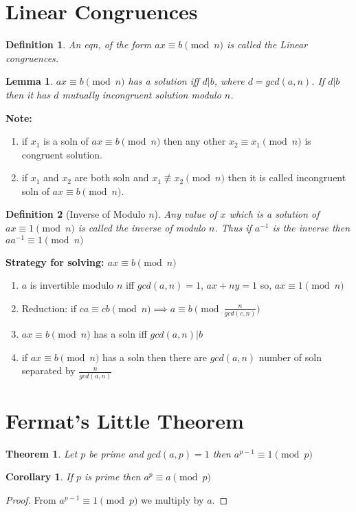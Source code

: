 \documentclass[12pt,a4paper]{article}
\newtheorem{thm}{Theorem}
\newtheorem{defn}{Definition}
\newtheorem{lem}{Lemma}
\newtheorem{cor}{Corollary}
\begin{document}
\section{Linear Congruences}
\begin{defn}
	An eqn, of the form $ax\equiv b \pmod n$ is called the Linear congruences.
\end{defn}
\begin{lem}
	$ax \equiv b \pmod n$ has a solution iff $d|b$, where $d=gcd(a,n)$. If $d|b$ then it has $d$ mutually incongruent solution modulo $n$.
\end{lem}
\textbf{Note: }
\begin{enumerate}
	\item if $x_{1}$ is a soln of $ax \equiv b \pmod n$ then any other $x_{2} \equiv x_{1}  \pmod n$ is congruent solution.
	\item if $x_{1}$ and $x_{2}$ are both soln and  $x_{1} \not \equiv x_{2}  \pmod n$ then it is called incongruent soln of $ax \equiv b \pmod n$.
\end{enumerate}

\begin{defn}[Inverse of Modulo $n$]
Any value of $x$ which is a solution of $ax \equiv 1 \pmod n$ is called the inverse of modulo $n$. Thus if $a^{-1}$ is the inverse then $aa^{-1} \equiv 1 \pmod n$
\end{defn}

\textbf{Strategy for solving: $ax \equiv b \pmod n$}
\begin{enumerate}
	\item $a$ is invertible modulo $n$ iff $gcd(a,n)=1$, $ax+ny=1$ so, $ax\equiv 1 \pmod n$
	\item Reduction: if $ca\equiv cb \pmod n \implies a \equiv b \pmod {\frac{n}{gcd(c,n)}}$
	\item $ax \equiv b \pmod n$ has a soln iff $gcd(a,n)|b$
	\item if $ax \equiv b \pmod n$ has a soln then there are $gcd(a,n)$ number of soln separated by $\frac{n}{gcd(a,n)}$
\end{enumerate}

\section{Fermat's Little Theorem}
\begin{thm}
	Let $p$ be prime and $gcd(a,p)=1$ then $a^{p-1} \equiv 1 \pmod p$
\end{thm}
\begin{cor}
	If $p$ is prime then $a^{p} \equiv a \pmod p$
\end{cor}
\begin{proof}
	From $a^{p-1} \equiv 1 \pmod p$ we multiply by $a$.
\end{proof}
\end{document}
